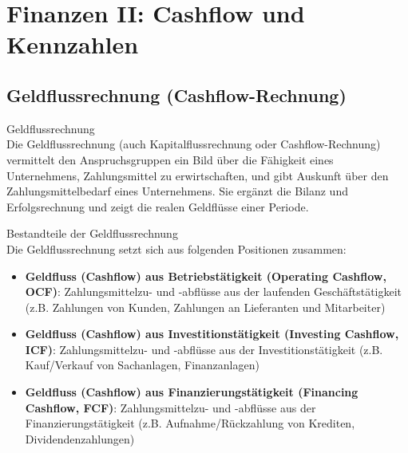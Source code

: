 \section{Finanzen II: Cashflow und Kennzahlen}

\subsection{Geldflussrechnung (Cashflow-Rechnung)}

\begin{definition}{Geldflussrechnung}\\
Die Geldflussrechnung (auch Kapitalflussrechnung oder Cashflow-Rechnung) vermittelt den Anspruchsgruppen ein Bild über die Fähigkeit eines Unternehmens, Zahlungsmittel zu erwirtschaften, und gibt Auskunft über den Zahlungsmittelbedarf eines Unternehmens. Sie ergänzt die Bilanz und Erfolgsrechnung und zeigt die realen Geldflüsse einer Periode.
\end{definition}

\begin{definition}{Bestandteile der Geldflussrechnung}\\
Die Geldflussrechnung setzt sich aus folgenden Positionen zusammen:
\begin{itemize}
    \item \textbf{Geldfluss (Cashflow) aus Betriebstätigkeit (Operating Cashflow, OCF)}: Zahlungsmittelzu- und -abflüsse aus der laufenden Geschäftstätigkeit (z.B. Zahlungen von Kunden, Zahlungen an Lieferanten und Mitarbeiter)
    \item \textbf{Geldfluss (Cashflow) aus Investitionstätigkeit (Investing Cashflow, ICF)}: Zahlungsmittelzu- und -abflüsse aus der Investitionstätigkeit (z.B. Kauf/Verkauf von Sachanlagen, Finanzanlagen)
    \item \textbf{Geldfluss (Cashflow) aus Finanzierungstätigkeit (Financing Cashflow, FCF)}: Zahlungsmittelzu- und -abflüsse aus der Finanzierungstätigkeit (z.B. Aufnahme/Rückzahlung von Krediten, Dividendenzahlungen)
\end{itemize}
\end{definition}

